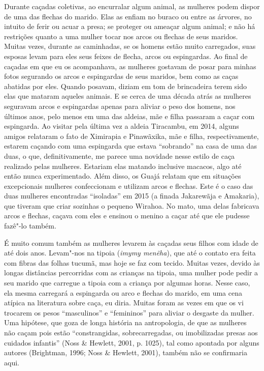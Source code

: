 Durante caçadas coletivas, ao encurralar algum animal, as mulheres podem
dispor de uma das flechas do marido. Elas as enfiam no buraco ou entre
as árvores, no intuito de ferir ou acuar a presa; se proteger ou ameaçar
algum animal; e não há restrições quanto a uma mulher tocar nos arcos ou
flechas de seus maridos. Muitas vezes, durante as caminhadas, se os
homens estão muito carregados, suas esposas levam para eles seus feixes
de flecha, arcos ou espingardas. Ao final de caçadas em que eu os
acompanhava, as mulheres gostavam de posar para minhas fotos segurando
os arcos e espingardas de seus maridos, bem como as caças abatidas por
eles. Quando posavam, diziam em tom de brincadeira terem sido elas que
mataram aqueles animais. E se cerca de uma década atrás as mulheres
seguravam arcos e espingardas apenas para aliviar o peso dos homens, nos
últimos anos, pelo menos em uma das aldeias, mãe e filha passaram a
caçar com espingarda. Ao visitar pela última vez a aldeia Tiracambu, em
2014, alguns amigos relataram o fato de Ximirapia e Pinawãxika, mãe e
filha, respectivamente, estarem caçando com uma espingarda que estava
``sobrando'' na casa de uma das duas, o que, definitivamente, me parece
uma novidade nesse estilo de caça realizado pelas mulheres. Estariam
elas matando inclusive macacos, algo até então nunca experimentado. Além
disso, os Guajá relatam que em situações excepcionais mulheres
confeccionam e utilizam arcos e flechas. Este é o caso das duas mulheres
encontradas ``isoladas'' em 2015 (a finada Jakarewãja e Amakaria), que
tiveram que criar sozinhas o pequeno Wirahoa. No mato, uma delas
fabricava arcos e flechas, caçava com eles e ensinou o menino a caçar
até que ele pudesse fazê"-lo também.

É muito comum também as mulheres levarem às caçadas seus filhos com
idade de até dois anos. Levam"-nos na tipoia (\emph{imymy menẽha}), que
até o contato era feita com fibras das folhas tucumã, mas hoje se faz
com tecido. Muitas vezes, devido às longas distâncias percorridas com as
crianças na tipoia, uma mulher pode pedir a seu marido que carregue a
tipoia com a criança por algumas horas. Nesse caso, ela mesma carregará
a espingarda ou arco e flechas do marido, em uma cena atípica na
literatura sobre caça, eu diria. Muitas foram as vezes em que os vi
trocarem os pesos ``masculinos'' e ``femininos'' para aliviar o desgaste da
mulher. Uma hipótese, que goza de longa história na antropologia, de que
as mulheres não caçam pois estão ``constrangidas, sobrecarregadas, ou
imobilizadas presas aos cuidados infantis'' (Noss \& Hewlett, 2001,
p. 1025), tal como apontada por alguns autores (Brightman, 1996; Noss \&
Hewlett, 2001), também não se confirmaria aqui.

